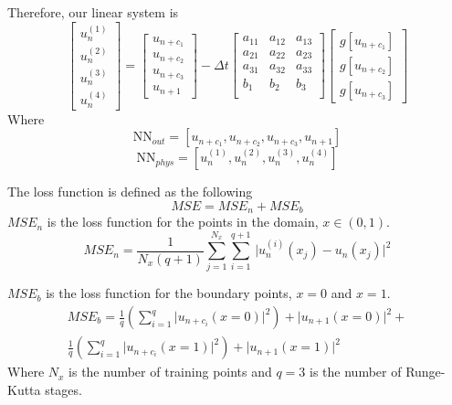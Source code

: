 \documentclass[a4paper,12pt]{article}
\theoremstyle{definition}
\begin{document}
Therefore, our linear system is 
\begin{equation}
\begin{bmatrix}
u_n^{(1)} \\ u_n^{(2)} \\ u_n^{(3)} \\ u_n^{(4)} 
\end{bmatrix}
=
\begin{bmatrix}
u_{n+c_1} \\ u_{n+c_2} \\ u_{n+c_3} \\ u_{n+1} 
\end{bmatrix}
-
\Delta t
\begin{bmatrix}
a_{11} & a_{12} & a_{13} \\
a_{21} & a_{22} & a_{23} \\
a_{31} & a_{32} & a_{33} \\
b_{1} & b_{2} & b_{3} \\
\end{bmatrix}
\begin{bmatrix}
g[u_{n+c_1}] \\ g[u_{n+c_2}] \\ g[u_{n+c_3}]
\end{bmatrix}
\end{equation}
Where 
$$
\text{NN}_{out} = [u_{n+c_1}, u_{n+c_2}, u_{n+c_3}, u_{n+1}]
$$
$$
\text{NN}_{phys} = [u_n^{(1)}, u_n^{(2)}, u_n^{(3)}, u_n^(4)]
$$

The loss function is defined as the following
\begin{equation}
MSE = MSE_n + MSE_b
\end{equation}
$MSE_n$ is the loss function for the points in the domain, $x \in (0, 1)$.
\begin{equation}
    MSE_n = \frac{1}{N_x  (q+1)}
    \sum_{j=1}^{N_x} \sum_{i=1}^{q+1} \,
    \Big| u^{(i)}_n(x_j) - u_n(x_j) \Big|^2
\end{equation}

$MSE_b$ is the loss function for the boundary points, $x=0$ and $x=1$.
\begin{multline}
MSE_b = \frac{1}{q} \left( \sum_{i=1}^{q} \Big| u_{n+c_i}(x=0) \Big|^2  \right)
+ \Big| u_{n+1}(x=0) \Big|^2 + \\
\frac{1}{q} \left( \sum_{i=1}^{q} \Big| u_{n+c_i}(x=1) \Big|^2  \right)
+ \Big| u_{n+1}(x=1) \Big|^2
\end{multline}
Where $N_x$ is the number of training points and $q = 3$ is the number of Runge-Kutta stages.
\end{document}
